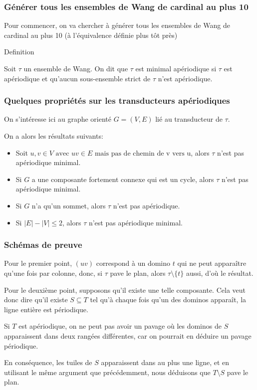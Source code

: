 \documentclass{beamer}
\renewcommand{\le}{\leqslant}
\newcommand{\sube}{\subseteq}
\begin{document}
\begin{frame}

\frametitle{Générer tous les ensembles de Wang de cardinal au plus 10}

Pour commencer, on va chercher à générer tous les ensembles de Wang de cardinal au plus 10 (à l'équivalence définie plus tôt près)

\begin{alertblock}{Definition}

Soit $\tau$ un ensemble de Wang. On dit que $\tau$ est minimal apériodique si $\tau$ est apériodique
et qu'aucun sous-ensemble strict de $\tau$ n'est apériodique.
    
\end{alertblock}
    
\end{frame}

\begin{frame}
\frametitle{Quelques propriétés sur les transducteurs apériodiques}

On s'intéresse ici au graphe orienté $G = (V,E)$ lié au transducteur de $\tau$.

On a alors les résultats suivants:

\begin{itemize}
    \item Soit $u,v \in V \text{ avec } uv \in E \text{ mais pas de chemin de v vers u}$, alors $\tau$ n'est pas apériodique minimal.
    \item Si $G$ a une composante fortement connexe qui est un cycle, alors $\tau$ n'est pas apériodique minimal.
    \item Si $G$ n'a qu'un sommet, alors $\tau$ n'est pas apériodique.
    \item Si $|E|-|V| \le 2$, alors $\tau$ n'est pas apériodique minimal.
\end{itemize}

\end{frame}

\begin{frame}
\frametitle{Schémas de preuve}

Pour le premier point, $(uv)$ correspond à un domino $t$ qui ne peut apparaître qu'une fois par colonne,
donc, si $\tau$ pave le plan, alors $\tau \setminus \{t \}$ aussi, d'où le résultat.

\;

Pour le deuxième point, supposons qu'il existe une telle composante. Cela veut donc dire qu'il existe $S \sube T$
tel qu'à chaque fois qu'un des dominos apparaît, la ligne entière est périodique.

Si $T$ est apériodique, on ne peut pas avoir un pavage où les dominos de $S$ apparaissent dans deux rangées différentes, car on pourrait en déduire un pavage périodique.

En conséquence, les tuiles de $S$ apparaissent dans au plus une ligne, et en utilisant le même argument que précédemment, nous déduisons que $T \setminus S$ pave le plan.


\end{frame}
\end{document}
